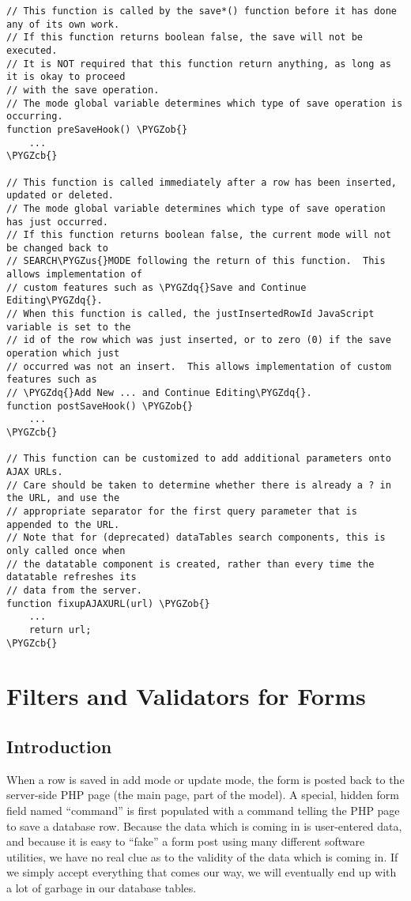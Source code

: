 \documentclass[letterpaper,10pt,english]{sphinxmanual}
\def\PYGZus{\char`\_}
\def\PYGZob{\char`\{}
\def\PYGZcb{\char`\}}
\def\PYGZdq{\char`\"}
\begin{document}
\begin{Verbatim}[commandchars=\\\{\}]
// This function is called by the save*() function before it has done any of its own work.
// If this function returns boolean false, the save will not be executed.
// It is NOT required that this function return anything, as long as it is okay to proceed
// with the save operation.
// The mode global variable determines which type of save operation is occurring.
function preSaveHook() \PYGZob{}
    ...
\PYGZcb{}

// This function is called immediately after a row has been inserted, updated or deleted.
// The mode global variable determines which type of save operation has just occurred.
// If this function returns boolean false, the current mode will not be changed back to
// SEARCH\PYGZus{}MODE following the return of this function.  This allows implementation of
// custom features such as \PYGZdq{}Save and Continue Editing\PYGZdq{}.
// When this function is called, the justInsertedRowId JavaScript variable is set to the
// id of the row which was just inserted, or to zero (0) if the save operation which just
// occurred was not an insert.  This allows implementation of custom features such as
// \PYGZdq{}Add New ... and Continue Editing\PYGZdq{}.
function postSaveHook() \PYGZob{}
    ...
\PYGZcb{}

// This function can be customized to add additional parameters onto AJAX URLs.
// Care should be taken to determine whether there is already a ? in the URL, and use the
// appropriate separator for the first query parameter that is appended to the URL.
// Note that for (deprecated) dataTables search components, this is only called once when
// the datatable component is created, rather than every time the datatable refreshes its
// data from the server.
function fixupAJAXURL(url) \PYGZob{}
    ...
    return url;
\PYGZcb{}
\end{Verbatim}


\chapter{Filters and Validators for Forms}
\label{jaxFrameworkGuide:filters-and-validators-for-forms}

\section{Introduction}
\label{jaxFrameworkGuide:id21}
When a row is saved in add mode or update mode, the form is posted back to the server-side PHP page
(the main page, part of the model).  A special, hidden form field named ``command'' is first populated
with a command telling the PHP page to save a database row.  Because the data which is coming in is
user-entered data, and because it is easy to ``fake'' a form post using many different software
utilities, we have no real clue as to the validity of the data which is coming in.  If we simply
accept everything that comes our way, we will eventually end up with a lot of garbage in our
database tables.
\end{document}
